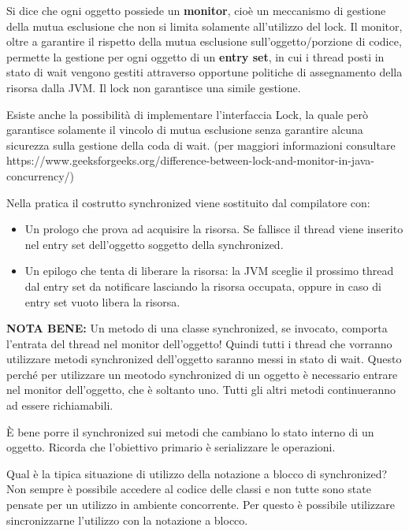 \documentclass{article}
\begin{document}
 \noindent Si dice che ogni oggetto possiede un \textbf{monitor}, cioè un meccanismo di gestione della mutua esclusione che non si limita solamente all'utilizzo del lock.
 Il monitor, oltre a garantire il rispetto della mutua esclusione sull'oggetto/porzione di codice, permette la gestione per ogni oggetto di un \textbf{entry set}, in cui 
 i thread posti in stato di wait vengono gestiti attraverso opportune politiche di assegnamento della risorsa dalla JVM. Il lock non garantisce una simile gestione.
 
 \noindent Esiste anche la possibilità di implementare l'interfaccia Lock, la quale però garantisce solamente il vincolo di mutua esclusione senza garantire alcuna sicurezza sulla
 gestione della coda di wait. (per maggiori informazioni consultare https://www.geeksforgeeks.org/difference-between-lock-and-monitor-in-java-concurrency/)
 \medskip

\noindent Nella pratica il costrutto synchronized viene sostituito dal compilatore con: \begin{itemize}
    \item Un prologo che prova ad acquisire la risorsa. Se fallisce il thread viene inserito nel entry set dell'oggetto soggetto della synchronized.
    \item Un epilogo che tenta di liberare la risorsa: la JVM sceglie il prossimo thread dal entry set da notificare lasciando la risorsa occupata, oppure in caso di 
    entry set vuoto libera la risorsa. 
\end{itemize}

\noindent \textbf{NOTA BENE:} Un metodo di una classe synchronized, se invocato, comporta l'entrata del thread nel monitor dell'oggetto! Quindi tutti i thread che vorranno 
utilizzare metodi synchronized dell'oggetto saranno messi in stato di wait. Questo perché per utilizzare un meotodo synchronized di un oggetto è necessario entrare nel monitor
dell'oggetto, che è soltanto uno. Tutti gli altri metodi continueranno ad essere richiamabili.

\noindent È bene porre il synchronized sui metodi che cambiano lo stato interno di un oggetto. Ricorda che l'obiettivo primario è serializzare le operazioni.
\medskip

\noindent Qual è la tipica situazione di utilizzo della notazione a blocco di synchronized? Non sempre è possibile accedere al codice delle classi e non tutte sono state pensate 
per un utilizzo in ambiente concorrente. Per questo è possibile utilizzare sincronizzarne l'utilizzo con la notazione a blocco.
\end{document}
